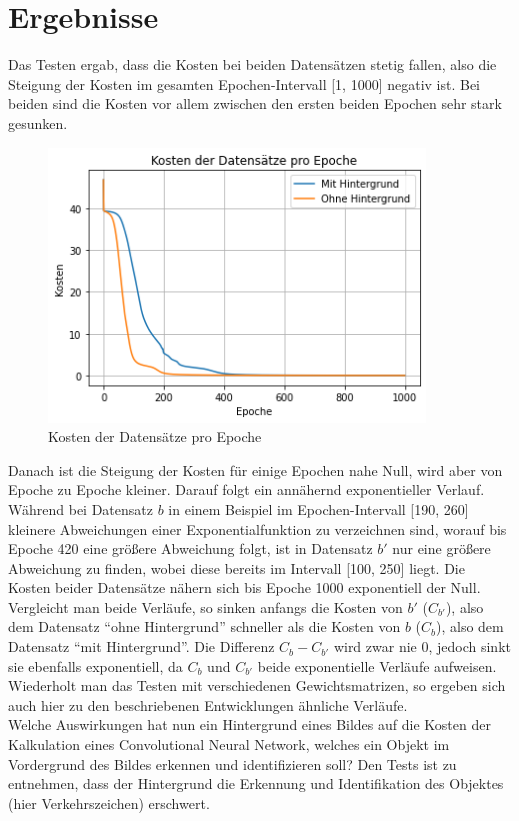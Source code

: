 \documentclass[paper=A4,pagesize=auto,12pt,headinclude=true,footinclude=true,BCOR=0mm,DIV=calc]{scrartcl}
\begin{document}
\section{Ergebnisse}
Das Testen ergab, dass die Kosten bei beiden Datensätzen stetig fallen, also die Steigung der Kosten im gesamten Epochen-Intervall [1, 1000] negativ ist. Bei beiden sind die Kosten vor allem zwischen den ersten beiden Epochen sehr stark gesunken. 
\begin{figure}
	\centering
	\includegraphics[width=10cm]{"images/test_plot.png"}
	\caption{Kosten der Datensätze pro Epoche}
	\label{testplot1}
\end{figure}
Danach ist die Steigung der Kosten für einige Epochen nahe Null, wird aber von Epoche zu Epoche kleiner. Darauf folgt ein annähernd exponentieller Verlauf. Während bei Datensatz $b$ in einem Beispiel im Epochen-Intervall [190, 260] kleinere Abweichungen einer Exponentialfunktion zu verzeichnen sind, worauf bis Epoche 420 eine größere Abweichung folgt, ist in Datensatz $b'$ nur eine größere Abweichung zu finden, wobei diese bereits im Intervall [100, 250] liegt. Die Kosten beider Datensätze nähern sich bis Epoche 1000 exponentiell der Null. Vergleicht man beide Verläufe, so sinken anfangs die Kosten von $b'$ ($C_{b'}$), also dem Datensatz ``ohne Hintergrund'' schneller als die Kosten von $b$ ($C_{b}$), also dem Datensatz ``mit Hintergrund''. Die Differenz $C_{b}-C_{b'}$ wird zwar nie 0, jedoch sinkt sie ebenfalls exponentiell, da $C_{b}$ und $C_{b'}$ beide exponentielle Verläufe aufweisen. \\
Wiederholt man das Testen mit verschiedenen Gewichtsmatrizen, so ergeben sich auch hier zu den beschriebenen Entwicklungen ähnliche Verläufe. \\
Welche Auswirkungen hat nun ein Hintergrund eines Bildes auf die Kosten der Kalkulation eines Convolutional Neural Network, welches ein Objekt im Vordergrund des Bildes erkennen und identifizieren soll? Den Tests ist zu entnehmen, dass der Hintergrund die Erkennung und Identifikation des Objektes (hier Verkehrszeichen) erschwert.
\end{document}
